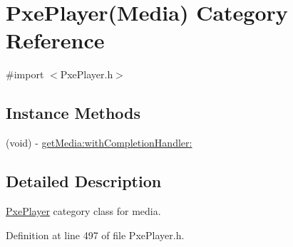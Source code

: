 \hypertarget{category_pxe_player_07_media_08}{\section{Pxe\-Player(Media) Category Reference}
\label{category_pxe_player_07_media_08}
}


{\ttfamily \#import $<$Pxe\-Player.\-h$>$}

\subsection*{Instance Methods}
\begin{DoxyCompactItemize}
\item 
(void) -\/ \hyperlink{category_pxe_player_07_media_08_a6dbce3db863cdd13fc40f0b64624a843}{get\-Media\-:with\-Completion\-Handler\-:}
\end{DoxyCompactItemize}


\subsection{Detailed Description}
\hyperlink{class_pxe_player}{Pxe\-Player} category class for media. 

Definition at line 497 of file Pxe\-Player.\-h.




